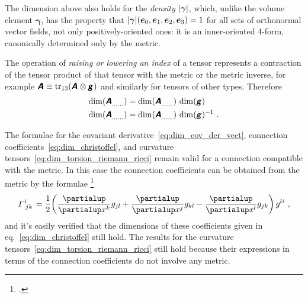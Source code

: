 \documentclass[\ifafour a4paper,12pt,\else a5paper,10pt,\fi%
onecolumn,oneside,article,%
british%
]{memoir}
\makeatletter
\theoremstyle{remark}
\theoremstyle{innote}
\newcommand*{\mathte}[1]{\textbf{\textit{\textsf{#1}}}}
\newcommand*{\citep}{\footcites}
\newcommand*{\de}{\partialup}%
\DeclareMathOperator{\tr}{tr}%
\DeclarePairedDelimiter\abs{\lvert}{\rvert}
\renewcommand*{\|}[1][]{\nonscript\,#1\vert\nonscript\;\mathopen{}}
\newcommand*{\sect}{\S}%
\newcommand*{\eqn}{eq.}%
\newcommand*{\q}{}%
\DeclareRobustCommand*{\q}{%
  \mathbin{\mathpalette\bigcdot@{}}%
}
\newcommand*{\bigcdot@scalefactor}{0.7}
\newcommand*{\bigcdot@widthfactor}{1.5}
\newcommand*{\bigcdot@}[2]{%
  \sbox0{$#1\vcenter{}$}%
  \sbox2{$#1\cdot\m@th$}%
  \hbox to \bigcdot@widthfactor\wd2{%
    \hfil
    \raise\ht0\hbox{%
      \scalebox{\bigcdot@scalefactor}{%
        \lower\ht0\hbox{$#1\bullet\m@th$}%
      }%
    }%
    \hfil
  }%
}
\newcommand*{\yA}{\mathte{A}}
\newcommand*{\yg}{\mathte{g}}
\renewcommand*{\i}{\indices}
\newcommand*{\dex}[1][i]{\frac{\de}{\de x^{#1}}}
\newcommand*{\yGa}{\varGamma}
\newcommand*{\ye}{\bm{e}}
\newcommand*{\ygv}{\bm{\gamma}}
\makeatother
\begin{document}
The dimension above also holds for the \emph{density} $\abs{\ygv}$, which,
unlike the volume element $\ygv$, has the property that
$\abs{\ygv}(\ye_{0},\ye_{1},\ye_{2},\ye_{3})=1$ for all sets of orthonormal
vector fields, not only positively-oriented ones: it is an inner-oriented
4-form, canonically determined only by the metric.

\medskip

The operation of \emph{raising or lowering an index} of a tensor represents a
contraction of the tensor product of that tensor with the metric or the
metric inverse, for example
$\yA\i{_{\q\q}} \equiv
\tr_{13}(\yA\i{^{\q}_{\q}}\otimes\yg\i{_{\q\q}})$ and similarly
for tensors of other types. Therefore
\begin{equation}
  \label{eq:raising_lowering}
  \begin{split}
  \dim(\yA\i{_{\dotso}_{\q}_{\dotso}}) &=
  \dim(\yA\i{_{\dotso}^{\q}_{\dotso}})\,\dim(\yg)
\\
  \dim(\yA\i{_{\dotso}^{\q}_{\dotso}}) &=
  \dim(\yA\i{_{\dotso}_{\q}_{\dotso}})\,\dim(\yg)^{-1} \ .
\end{split}
\end{equation}

\medskip

The formulae for the covariant derivative~\eqref{eq:dim_cov_der_vect},
connection coefficients~\eqref{eq:dim_christoffel}, and curvature
tensors~\eqref{eq:dim_torsion_riemann_ricci} remain valid for a connection
compatible with the metric. In this case the connection coefficients can be
obtained from the metric by the formulae
\citep[\sect~V.B.2]{choquetbruhatetal1977_r1996}
\begin{equation}
  \label{eq:christoffel_g}
  \yGa\i{^{i}_{jk}} = \frac{1}{2}
  \biggl(\dex[k]g_{jl} + \dex[j]g_{kl} - \dex[l]g_{jk}\biggr)\,g^{li} \ ,
\end{equation}
and it's easily verified that the dimensions of these coefficients given in
\eqn~\eqref{eq:dim_christoffel} still hold. The results for the
curvature tensors~\eqref{eq:dim_torsion_riemann_ricci} still hold because
their expressions in terms of the connection coefficients do not involve
any metric.

\medskip
\end{document}

